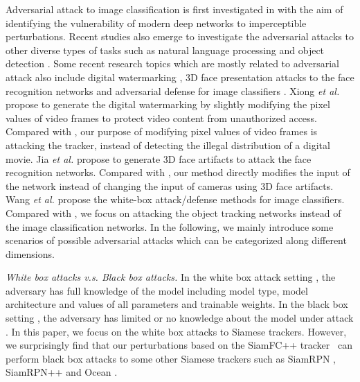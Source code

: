 \documentclass[journal]{IEEEtran}
\renewcommand{\uline}{}
\begin{document}
Adversarial attack \cite{9169672} to image classification is first investigated in \cite{intriguing} with the aim of identifying the vulnerability of modern deep networks to imperceptible perturbations. Recent studies also emerge to investigate the adversarial attacks to other diverse types of tasks such as natural language processing \cite{generating,zhang2020adversarial,morris2020textattack,jin2020bert} and object detection \cite{wei2019transferable}. Some recent research topics which are mostly related to adversarial attack also include digital watermarking \cite{9343885}, 3D face presentation attacks to the face recognition networks \cite{9294085} and adversarial defense for image classifiers \cite{9169672}. Xiong \textit{et al.} \cite{9343885} propose to generate the digital watermarking by slightly modifying the pixel values of video frames to protect video content from unauthorized access. Compared with \cite{9343885}, our purpose of modifying pixel values of video frames is attacking the tracker, instead of detecting the illegal distribution of a digital movie. Jia \textit{et al.} \cite{9294085} propose to generate 3D face artifacts to attack the face recognition \uline{networks}. Compared with \cite{9294085}, our method directly modifies the input of the network instead of changing the input of cameras using 3D face artifacts. Wang \textit{et al.} \cite{9169672} propose the white-box attack/defense methods for image classifiers. Compared with \cite{9169672}, we focus on attacking the object tracking networks instead of the image classification networks. In the following, we mainly introduce some scenarios of possible adversarial attacks which can be categorized along different dimensions.

\textit{White box attacks v.s. Black box attacks\uline{.}} In the white box attack setting \cite{meng2019white}, the adversary has full knowledge of the model including model type, model architecture and values of all parameters and trainable weights. In the black box setting \cite{cheng2018query,li2019nattack,papernot2017practical,li2020projection}, the adversary has limited or no knowledge about the model under attack \cite{kurakin2018adversarial}. In this paper, we focus on the white box \uline{attacks to} Siamese trackers. However, we surprisingly find that \uline{our} perturbations based on the SiamFC++ tracker~\cite{SiamFC++} can perform black box attacks to some other Siamese trackers such as SiamRPN \cite{SiamRPN}, SiamRPN++ \cite{SiamRPN++} and Ocean \cite{zhang2020ocean}.
\end{document}
